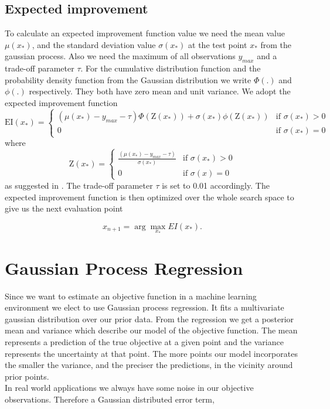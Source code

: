 \subsection{Expected improvement}
To calculate an expected improvement function value we need the mean value $\mu(x_*)$, and the standard deviation value $\sigma(x_*)$ at the test point $x_*$ from the gaussian process. Also we need the maximum of all observations $y_{max}$ and a trade-off parameter $\tau$. For the cumulative distribution function and the probability density function from the Gaussian distribution we write $\Phi(.)$ and $\phi(.)$ respectively. They both have zero mean and unit variance.
We adopt the expected improvement function
\[
    \mathrm{EI}(x_*)=
\begin{cases}
    (\mu(x_*) - y_{max} - \tau)\Phi(\mathrm{Z}(x_*))+\sigma(x_*)\phi(\mathrm{Z}(x_*))& \text{if } \sigma(x_*)> 0\\
    0 & \text{if } \sigma(x_*)= 0
\end{cases}
\]
where
\[
    \mathrm{Z}(x_*)=
\begin{cases}
    \frac{(\mu(x_*) -y_{max} - \tau)}{\sigma(x_*)} & \text{if } \sigma(x_*)> 0\\
    0 & \text{if } \sigma(x)= 0
\end{cases}
\]
as suggested in \cite{brochu2010tutorial}. The trade-off parameter $\tau$ is set to 0.01 accordingly. The expected improvement function is then optimized over the whole search space to give us the next evaluation point

$$x_{n+1} = \arg \max_{x_*} EI(x_*).$$

\section{Gaussian Process Regression}
Since we want to estimate an objective function in a machine learning environment we elect to use Gaussian process regression. It fits a multivariate gaussian distribution over our prior data. From the regression we get a posterior mean and variance which describe our model of the objective function. The mean represents a prediction of the true objective at a given point and the variance represents the uncertainty at that point. The more points our model incorporates the smaller the variance, and the preciser the predictions, in the vicinity around prior points.\\
In real world applications we always have some noise in our objective observations. Therefore a Gaussian distributed error term,

